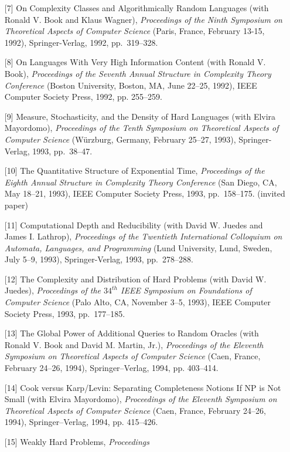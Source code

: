 \begin{enumerate}
\item[{[7]}] On Complexity Classes and Algorithmically Random Languages
(with Ronald V. Book and Klaus Wagner), {\it Proceedings of the Ninth
Symposium on Theoretical Aspects of Computer Science} (Paris, France,
February 13-15, 1992), Springer-Verlag, 1992, pp.~319--328.
\item[{[8]}] On Languages With Very High Information Content
(with Ronald V. Book), {\it Proceedings of the Seventh Annual
Structure in Complexity Theory Conference} (Boston University, 
Boston, MA, June 22--25, 1992), IEEE Computer Society Press, 1992, pp. 255--259.
\item[{[9]}] Measure, Stochasticity, and the Density of Hard Languages
(with Elvira Mayordomo), {\it Proceedings of the Tenth Symposium on 
Theoretical Aspects of Computer Science} \linebreak (W\"{u}rzburg, Germany, 
February 25--27, 1993), Springer-Verlag, 1993, pp.~38--47.
\item[{[10]}] The Quantitative Structure of Exponential Time, {\it Proceedings
of the Eighth Annual Structure in Complexity Theory Conference\/} (San
Diego, CA, May 18--21, 1993), IEEE Computer Society Press, 1993, pp.~158--175.  (invited paper)
\item[{[11]}] Computational Depth and Reducibility (with David W.
Juedes and James I. Lathrop), {\em Proceedings of the Twentieth
International Colloquium on Automata, Languages, and Programming\/} (Lund
University, Lund, Sweden, July 5--9, 1993), Springer-Verlag, 1993, 
pp.~278--288.
\item[{[12]}] The Complexity and Distribution of Hard Problems 
(with David W. Juedes), {\it Proceedings of the $34^{th}$ IEEE
Symposium on Foundations of Computer Science\/} (Palo Alto, CA,
November 3--5, 1993), IEEE Computer Society Press, 1993, pp.~177--185.
\item[{[13]}] The Global Power of Additional Queries to Random Oracles
(with Ronald V. Book and David M. Martin, Jr.),
{\it Proceedings of the Eleventh Symposium on Theoretical Aspects of
Computer Science\/} (Caen, France, February 24--26, 1994), Springer--Verlag,
1994, pp. 403--414.
\item[{[14]}] Cook versus Karp/Levin: Separating Completeness 
Notions If NP is Not Small (with Elvira Mayordomo),
{\it Proceedings of the Eleventh Symposium on Theoretical Aspects of
Computer Science\/} (Caen, France, February 24--26, 1994), Springer--Verlag,
1994, pp. 415--426.
\item[{[15]}] Weakly Hard Problems, {\it Proceedings
}
\end{enumerate}
